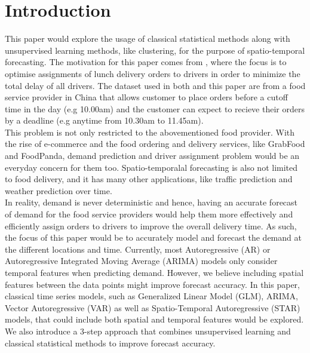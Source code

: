 \documentclass[nonblindrev,msom]{informs3} %
\begin{document}

\newpage
\section{Introduction}

This paper would explore the usage of classical statistical methods along with unsupervised learning methods, like clustering, for the purpose of spatio-temporal forecasting. The motivation for this paper comes from \cite{Sheng2018}, where the focus is to optimise assignments of lunch delivery orders to drivers in order to minimize the total delay of all drivers. The dataset used in both \cite{Sheng2018} and this paper are from a food service provider in China that allows customer to place orders before a cutoff time in the day (e.g 10.00am) and the customer can expect to recieve their orders by a deadline (e.g anytime from 10.30am to 11.45am). \\

\noindent This problem is not only restricted to the abovementioned food provider. With the rise of e-commerce and the food ordering and delivery services, like GrabFood and FoodPanda, demand prediction and driver assignment problem would be an everyday concern for them too. Spatio-temporalal forecasting is also not limited to food delivery, and it has many other applications, like traffic prediction and weather prediction over time. \\

\noindent In reality, demand is never deterministic and hence, having an accurate forecast of demand for the food service providers would help them more effectively and efficiently assign orders to drivers to improve the overall delivery time. As such, the focus of this paper would be to accurately model and forecast the demand at the different locations and time. Currently, most Autoregressive (AR) or Autoregressive Integrated Moving Average (ARIMA) models only consider temporal features when predicting demand. However, we believe including spatial features between the data points might improve forecast accuracy. In this paper, classical time series models, such as Generalized Linear Model (GLM), ARIMA, Vector Autoregressive (VAR) as well as Spatio-Temporal Autoregressive (STAR) models, that could include both spatial and temporal features would be explored. We also introduce a 3-step approach that combines unsupervised learning and classical statistical methods to improve forecast accuracy. 
\end{document}
